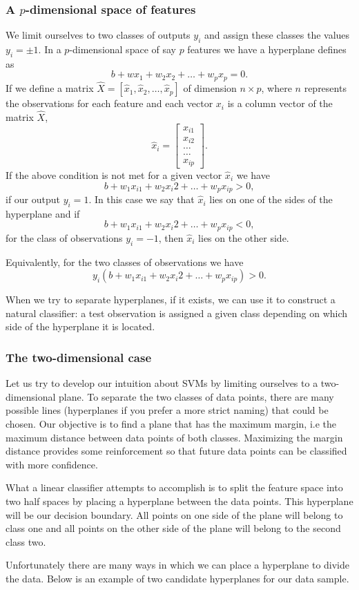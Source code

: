 \documentclass{beamer}
\begin{document}
\begin{frame}
\frametitle{A $p$-dimensional space of features}

We limit ourselves to two classes of outputs $y_i$ and assign these classes the values $y_i = \pm 1$. 
In a $p$-dimensional space of say $p$ features we have a hyperplane defines as 
\[
b+wx_1+w_2x_2+\dots +w_px_p=0.
\]
If we define a 
matrix $\hat{X}=\left[\hat{x}_1,\hat{x}_2,\dots, \hat{x}_p\right]$
of dimension $n\times p$, where $n$ represents the observations for each feature and each vector $x_i$ is a column vector of the matrix $\hat{X}$, 
\[
\hat{x}_i = \begin{bmatrix} x_{i1} \\ x_{i2} \\ \dots \\ \dots \\ x_{ip} \end{bmatrix}.
\]
If the above condition is not met for a given vector $\hat{x}_i$ we have 
\[
b+w_1x_{i1}+w_2x_{i}2+\dots +w_px_{ip} >0,
\]
if our output $y_i=1$.
In this case we say that $\hat{x}_i$ lies on one of the sides of the hyperplane and if 
\[
b+w_1x_{i1}+w_2x_{i}2+\dots +w_px_{ip} < 0,
\]
for the class of observations $y_i=-1$, 
then $\hat{x}_i$ lies on the other side. 

Equivalently, for the two classes of observations we have 
\[
y_i\left(b+w_1x_{i1}+w_2x_{i}2+\dots +w_px_{ip}\right) > 0. 
\]

When we try to separate hyperplanes, if it exists, we can use it to construct a natural classifier: a test observation is assigned a given class depending on which side of the hyperplane it is located.
\end{frame}

\begin{frame}
\frametitle{The two-dimensional case}

Let us try to develop our intuition about SVMs by limiting ourselves to a two-dimensional
plane.  To separate the two classes of data points, there are many
possible lines (hyperplanes if you prefer a more strict naming)  
that could be chosen. Our objective is to find a
plane that has the maximum margin, i.e the maximum distance between
data points of both classes. Maximizing the margin distance provides
some reinforcement so that future data points can be classified with
more confidence.

What a linear classifier attempts to accomplish is to split the
feature space into two half spaces by placing a hyperplane between the
data points.  This hyperplane will be our decision boundary.  All
points on one side of the plane will belong to class one and all points
on the other side of the plane will belong to the second class two.

Unfortunately there are many ways in which we can place a hyperplane
to divide the data.  Below is an example of two candidate hyperplanes
for our data sample.
\end{frame}
\end{document}
